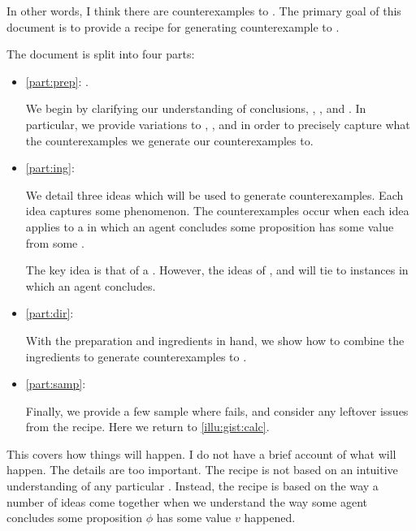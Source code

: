 \begin{note}
  In other words, I think there are counterexamples to \issueInclusion{}.
  The primary goal of this document is to provide a recipe for generating counterexample to \issueInclusion{}.

  The document is split into four parts:

  \begin{itemize}
  \item
    \autoref{part:prep}: .

    We begin by clarifying our understanding of conclusions, \qWhy{}, \qHow{}, and \issueInclusion{}.
    In particular, we provide variations to \qWhy{}, \qHow{}, and \issueInclusion{} in order to precisely capture what the counterexamples we generate our counterexamples to.
  \item
    \autoref{part:ing}: 

    We detail three ideas which will be used to generate counterexamples.
    Each idea captures some phenomenon.
    The counterexamples occur when each idea applies to a  in which an agent concludes some proposition has some value from some \pool{}.

    The key idea is that of a \fc{}.
    However, the ideas of \tC{}, and \requ{} will tie  to instances in which an agent concludes.
  \item
    \autoref{part:dir}: 

    With the preparation and ingredients in hand, we show how to combine the ingredients to generate counterexamples to \issueInclusion{}.
  \item
    \autoref{part:samp}: 

    Finally, we provide a few sample  where \issueInclusion{} fails, and consider any leftover issues from the recipe.
    Here we return to \autoref{illu:gist:calc}.
  \end{itemize}

  This covers how things will happen.
  I do not have a brief account of what will happen.
  The details are too important.
  The recipe is not based on an intuitive understanding of any particular \scen{}.
  Instead, the recipe is based on the way a number of ideas come together when we understand the way some agent concludes some proposition \(\phi\) has some value \(v\) happened.
\end{note}



